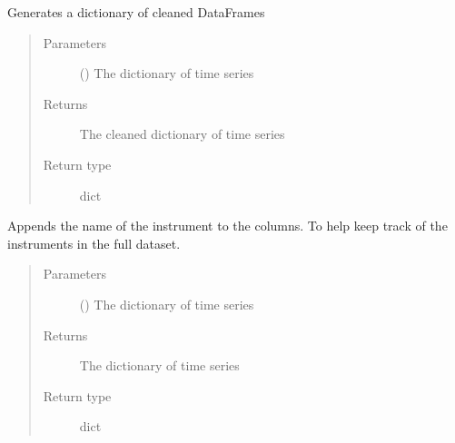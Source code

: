 \documentclass[letterpaper,10pt,english]{sphinxmanual}
\begin{document}

\begin{fulllineitems}
\label{\detokenize{index:Forecaster.preprocessing.clean_dict_gen}}
Generates a dictionary of cleaned DataFrames
\begin{quote}\begin{description}
\item[{Parameters}] \leavevmode
{} () \textendash{} The dictionary of time series

\item[{Returns}] \leavevmode
The cleaned dictionary of time series

\item[{Return type}] \leavevmode
dict

\end{description}\end{quote}

\end{fulllineitems}


\begin{fulllineitems}
\label{\detokenize{index:Forecaster.preprocessing.column_rename}}
Appends the name of the instrument to the columns.
To help keep track of the instruments in the full dataset.
\begin{quote}\begin{description}
\item[{Parameters}] \leavevmode
{} () \textendash{} The dictionary of time series

\item[{Returns}] \leavevmode
The dictionary of time series

\item[{Return type}] \leavevmode
dict

\end{description}\end{quote}

\end{fulllineitems}
\end{document}
